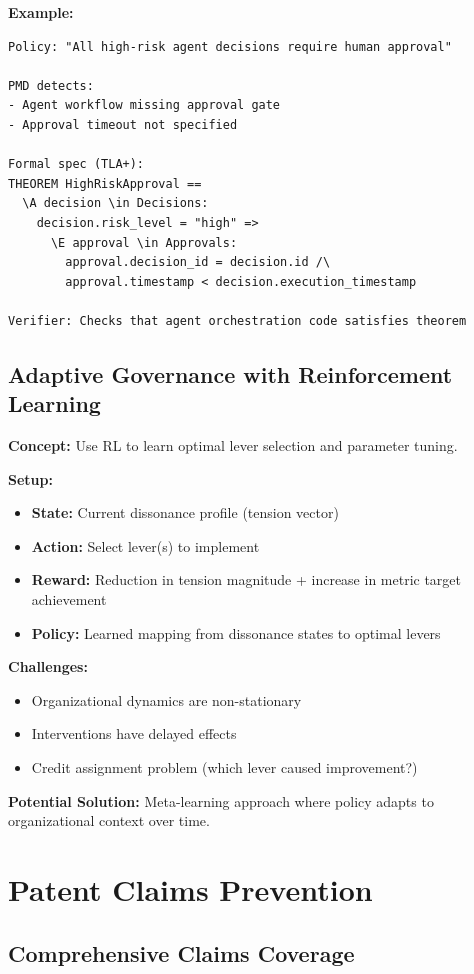 \documentclass[11pt,a4paper]{article}
\begin{document}
\textbf{Example:}
\begin{verbatim}
Policy: "All high-risk agent decisions require human approval"

PMD detects:
- Agent workflow missing approval gate
- Approval timeout not specified

Formal spec (TLA+):
THEOREM HighRiskApproval ==
  \A decision \in Decisions:
    decision.risk_level = "high" =>
      \E approval \in Approvals:
        approval.decision_id = decision.id /\
        approval.timestamp < decision.execution_timestamp

Verifier: Checks that agent orchestration code satisfies theorem
\end{verbatim}

\subsection{Adaptive Governance with Reinforcement Learning}

\textbf{Concept:} Use RL to learn optimal lever selection and parameter tuning.

\textbf{Setup:}
\begin{itemize}
\item \textbf{State:} Current dissonance profile (tension vector)
\item \textbf{Action:} Select lever(s) to implement
\item \textbf{Reward:} Reduction in tension magnitude + increase in metric target achievement
\item \textbf{Policy:} Learned mapping from dissonance states to optimal levers
\end{itemize}

\textbf{Challenges:}
\begin{itemize}
\item Organizational dynamics are non-stationary
\item Interventions have delayed effects
\item Credit assignment problem (which lever caused improvement?)
\end{itemize}

\textbf{Potential Solution:} Meta-learning approach where policy adapts to organizational context over time.

\section{Patent Claims Prevention}

\subsection{Comprehensive Claims Coverage}
\end{document}
